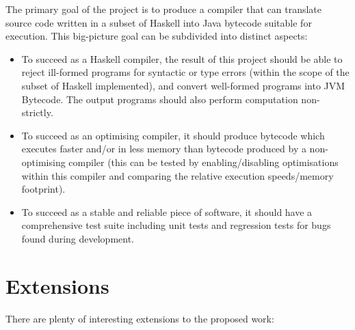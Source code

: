 \documentclass[12pt]{article}
\begin{document}
The primary goal of the project is to produce a compiler that can translate source code written in a subset of Haskell
into Java bytecode suitable for execution. This big-picture goal can be subdivided into distinct aspects:

\begin{itemize}
\item
{
    
    To succeed as a Haskell compiler, the result of this project should be able to reject ill-formed programs for
    syntactic or type errors (within the scope of the subset of Haskell implemented), and convert well-formed programs
    into JVM Bytecode. The output programs should also perform computation non-strictly.

}
\item
{
    
    To succeed as an optimising compiler, it should produce bytecode which executes faster and/or in less memory than
    bytecode produced by a non-optimising compiler (this can be tested by enabling/disabling optimisations within this
    compiler and comparing the relative execution speeds/memory footprint).

}
\item
{
    
    To succeed as a stable and reliable piece of software, it should have a comprehensive test suite including unit
    tests and regression tests for bugs found during development.

}
\end{itemize}


\section*{Extensions}

There are plenty of interesting extensions to the proposed work:
\end{document}
